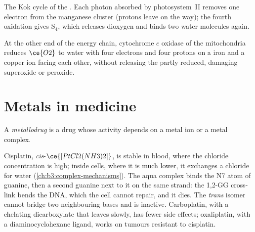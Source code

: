 \begin{omfigure}

{\small The Kok cycle of the . Each photon absorbed by
photosystem~II removes one electron from the manganese cluster (protons
leave on the way); the fourth oxidation gives $\mathrm S_4$, which releases dioxygen and
binds two water molecules again.}
\end{omfigure}

At the other end of the energy chain, cytochrome $c$ oxidase of the
mitochondria reduces $\ce{O2}$ to water with four electrons and four protons on a
 iron and a copper ion facing each other, without releasing the partly
reduced, damaging superoxide or peroxide.

\section{Metals in medicine}

\begin{definition}[Metallodrugs]\label{def:b3:bioinorganic:metallodrug}
A \emph{metallodrug} is a drug whose activity depends on a
metal ion or a metal complex.
\end{definition}

Cisplatin, \textit{cis}-$\ce{[PtCl2(NH3)2]}$, is stable in blood, where the chloride concentration is
high; inside cells, where it is much lower, it exchanges a chloride for water
(\cref{ch:b3:complex-mechanisms}). The aqua complex binds the N7 atom of
guanine, then a second guanine next to it on the same strand: the 1,2-GG
cross-link bends the DNA, which the cell cannot repair, and it dies. The
\textit{trans} isomer cannot bridge two neighbouring bases and is inactive.
Carboplatin, with a chelating dicarboxylate that leaves slowly, has fewer
side effects; oxaliplatin, with a diaminocyclohexane ligand, works on tumours
resistant to cisplatin.

